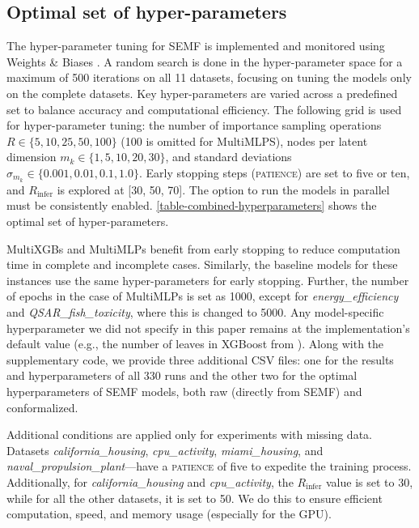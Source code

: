 \documentclass{article}
\begin{document}
\begin{appendix}
\section{Optimal set of hyper-parameters}
\label{appendix:optimal-semf}

The hyper-parameter tuning for SEMF is implemented and monitored using Weights \& Biases \cite{wandb}. A random search is done in the hyper-parameter space for a maximum of 500 iterations on all 11 datasets, focusing on tuning the models only on the complete datasets. Key hyper-parameters are varied across a predefined set to balance accuracy and computational efficiency. The following grid is used for hyper-parameter tuning: the number of importance sampling operations $R \in \lbrace 5, 10, 25, 50, 100 \rbrace$ (100 is omitted for MultiMLPS), nodes per latent dimension $m_k \in \lbrace 1, 5, 10, 20, 30 \rbrace$, and standard deviations $\sigma_{m_k} \in \lbrace 0.001, 0.01, 0.1, 1.0 \rbrace$. Early stopping steps (\textsc{patience}) are set to five or ten, and $R_{\text{infer}}$ is explored at [30, 50, 70]. The option to run the models in parallel must be consistently enabled. \autoref{table-combined-hyperparameters} shows the optimal set of hyper-parameters. 



MultiXGBs and MultiMLPs benefit from early stopping to reduce computation time in complete and incomplete cases. Similarly, the baseline models for these instances use the same hyper-parameters for early stopping. Further, the number of epochs in the case of MultiMLPs is set as 1000, except for \textit{energy\_efficiency} and \textit{QSAR\_fish\_toxicity}, where this is changed to 5000. Any model-specific hyperparameter we did not specify in this paper remains at the implementation's default value (e.g., the number of leaves in XGBoost from \cite{chen2016xgboost}). Along with the supplementary code, we provide three additional CSV files: one for the results and hyperparameters of all 330 runs and the other two for the optimal hyperparameters of SEMF models, both raw (directly from SEMF) and conformalized.

Additional conditions are applied only for experiments with missing data. Datasets \textit{california\_housing}, \textit{cpu\_activity}, \textit{miami\_housing}, and \textit{naval\_propulsion\_plant}—have a \textsc{patience} of five to expedite the training process. Additionally, for \textit{california\_housing} and \textit{cpu\_activity}, the $R_{\text{infer}}$ value is set to 30, while for all the other datasets, it is set to 50. We do this to ensure efficient computation, speed, and memory usage (especially for the GPU).


\end{appendix}
\end{document}
